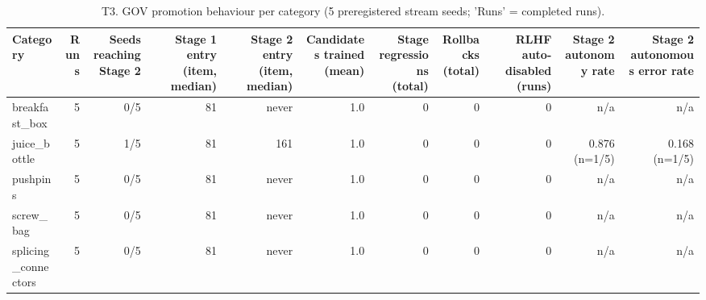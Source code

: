 \begin{table}[t]\centering\small
\caption{T3. GOV promotion behaviour per category (5 preregistered stream seeds; 'Runs' = completed runs).}
\label{tab:T3_amp_promotion}
\begin{tabular}{lrrrrrrrrrr}\hline
Category & Runs & Seeds reaching Stage 2 & Stage 1 entry (item, median) & Stage 2 entry (item, median) & Candidates trained (mean) & Stage regressions (total) & Rollbacks (total) & RLHF auto-disabled (runs) & Stage 2 autonomy rate & Stage 2 autonomous error rate \\ \hline
breakfast\_box & 5 & 0/5 & 81 & never & 1.0 & 0 & 0 & 0 & n/a & n/a \\
juice\_bottle & 5 & 1/5 & 81 & 161 & 1.0 & 0 & 0 & 0 & 0.876 (n=1/5) & 0.168 (n=1/5) \\
pushpins & 5 & 0/5 & 81 & never & 1.0 & 0 & 0 & 0 & n/a & n/a \\
screw\_bag & 5 & 0/5 & 81 & never & 1.0 & 0 & 0 & 0 & n/a & n/a \\
splicing\_connectors & 5 & 0/5 & 81 & never & 1.0 & 0 & 0 & 0 & n/a & n/a \\
\hline\end{tabular}
\end{table}
